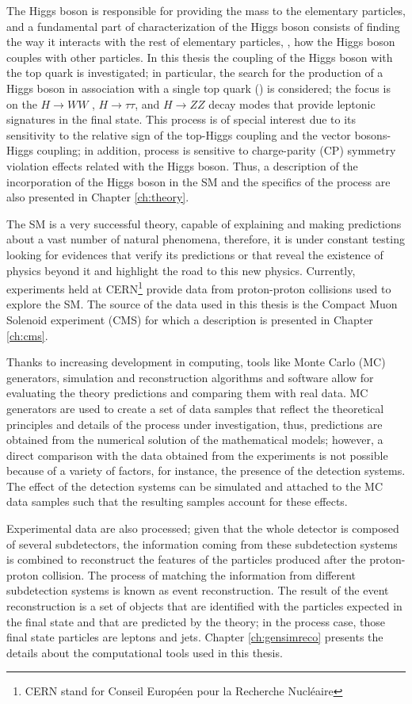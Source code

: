 The Higgs boson is responsible for providing the mass to the elementary particles, and a fundamental part of characterization of the Higgs boson consists of finding the way it interacts with the rest of elementary particles, \ie, how the Higgs boson couples with other particles. In this thesis the coupling of the Higgs boson with the top quark is investigated; in particular, the search for the production of a Higgs boson in association with a single top quark (\tH) is considered; the focus is on the $H \to WW$ , $H \to \tau\tau$, and $H \to ZZ$ decay modes that provide leptonic signatures in the final state. This process is of special interest due to its sensitivity to the relative sign of the top-Higgs coupling and the vector bosons-Higgs coupling; in addition, \tH process is sensitive to charge-parity (CP) symmetry violation effects related with the Higgs boson. Thus, a description of the incorporation of the Higgs boson in the SM and the specifics of the \tH process are also presented in Chapter \ref{ch:theory}.               

The SM is a very successful theory, capable of explaining and making predictions about a vast number of natural phenomena, therefore, it is under constant testing looking for evidences that verify its predictions or that reveal the existence of physics beyond it and highlight the road to this new physics. Currently, experiments held at CERN\footnote{CERN stand for Conseil Europ\'een pour la Recherche Nucl\'eaire} provide data from proton-proton collisions used to explore the SM. The source of the data used in this thesis is the Compact Muon Solenoid experiment (CMS) for which a description is presented in Chapter \ref{ch:cms}.

Thanks to increasing development in computing, tools like Monte Carlo (MC) generators, simulation and reconstruction algorithms and software allow for evaluating the theory predictions and comparing them with real data. MC generators are used to create a set of data samples that reflect the theoretical principles and details of the process under investigation, thus, predictions are obtained from the numerical solution of the mathematical models; however, a direct comparison with the data obtained from the experiments is not possible because of a variety of factors, for instance, the presence of the detection systems. The effect of the detection systems can be simulated and attached to the MC data samples such that the resulting samples account for these effects.

Experimental data are also processed; given that the whole detector is composed of several subdetectors, the information coming from these subdetection systems is combined to reconstruct the features of the particles produced after the proton-proton collision. The process of matching the information from different subdetection systems is known as event reconstruction. The result of the event reconstruction is a set of objects that are identified with the particles expected in the final state and that are predicted by the theory; in the \tH process case, those final state particles are leptons and jets. Chapter \ref{ch:gensimreco} presents the details about the computational tools used in this thesis.  

